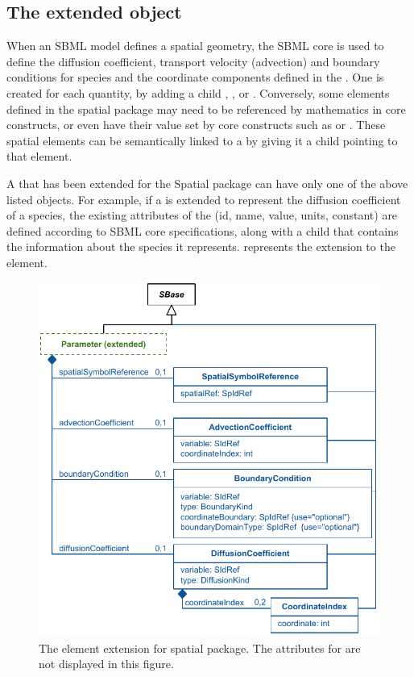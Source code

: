 \subsection{The extended \Parameter object}
\label{extended-parameter-class}
When an SBML model defines a spatial geometry, the SBML core \Parameter is used to define the diffusion coefficient, transport velocity (advection) and boundary conditions for species and the coordinate components defined in the \Geometry. One \Parameter is created for each quantity, by adding a child \DiffusionCoefficient, \AdvectionCoefficient, or \BoundaryCondition.  Conversely, some elements defined in the spatial package may need to be referenced by mathematics in core constructs, or even have their value set by core constructs such as \InitialAssignment or \Rule.  These spatial elements can be semantically linked to a \Parameter by giving it a child \SpatialSymbolReference pointing to that element.

A \Parameter that has been extended for the Spatial package can have only one of the above listed objects.  For example, if a \Parameter is extended to represent the diffusion coefficient of a species, the existing attributes of the \Parameter (id, name, value, units, constant) are defined according to SBML core specifications, along with a \DiffusionCoefficient child that contains the information about the species it represents.  represents the extension to the \Parameter element.

\begin{figure}[ht]
  \includegraphics{figs/extended-parameter-uml}
  \caption{The \Parameter element extension for spatial package. The \sbmlthreecore attributes for \Parameter are not displayed in this figure.}
  \label{parameter-uml}
\end{figure}



